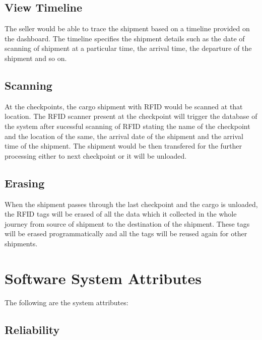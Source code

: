 \documentclass{scrreprt}
\begin{document}
   \subsection{ View Timeline}
   
   The seller would be able to trace the shipment based on a timeline provided on the dashboard. The timeline specifies the shipment details such as the date of scanning of shipment at a particular time, the arrival time, the departure of the shipment and so on.
   
   \subsection{ Scanning}
   
   At the checkpoints, the cargo shipment with RFID would be scanned at that location. The RFID scanner present at the checkpoint  will trigger the database of the system after sucessful scanning of RFID stating the name of the checkpoint and the location of the same, the arrival date of the shipment and the arrival time of the shipment. The shipment would be then transfered for the further processing either to next checkpoint or it will be unloaded.
   
   \subsection{ Erasing}
   
   When the shipment passes through the last checkpoint and the cargo is unloaded, the RFID tags will be erased of all the data which it collected in the whole journey from source of shipment to the destination of the shipment. These tags will be erased programmatically and all the tags will be reused again for other shipments.  \newline \newline
      
    




\section{Software System Attributes}
The following are the system attributes: \newline

    
    
    
    \subsection{ Reliability}
    
\end{document}
